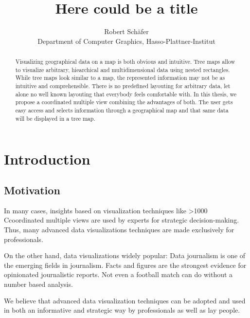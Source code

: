 \documentclass{article}
\begin{document}
\title{Here could be a title}\label{here-could-be-a-title}
\author{Robert Schäfer\\ Department of Computer Graphics, Hasso-Plattner-Institut}
\maketitle

\newcommand{\rufu}{Rundfunk \textsc{mitbestimmen}}
\newcommand\hmm[1]{\ifnum\ifhmode\spacefactor\else2000\fi>1000 \uppercase{#1}\else#1\fi}
\newcommand{\cmv}{\hmm{c}oordinated multiple view}
\newcommand{\cmvs}{\hmm{c}oordinated multiple views}

\begin{abstract}
  Visualizing geographical data on a map is both obvious and intuitive.
  Tree maps allow to visualize arbitrary, hiearchical and multidimensional data using nested rectangles.
  While tree maps look similar to a map, the represented information may not be as intuitive and comprehensible.
  There is no predefined layouting for arbitrary data, let alone no well known layouting that everybody feels comfortable with.
  In this thesis, we propose a coordinated multiple view combining the advantages of both.
  The user gets easy access and selects information through a geographical map and that same data will be displayed in a tree map.
\end{abstract}

\section{Introduction}

\subsection{Motivation}

In many cases, insights based on visualization techniques like \cmvs{} are used by experts for strategic decision-making.
Thus, many advanced data visualizations techniques are made exclusively for professionals.

On the other hand, data visualizations widely popular:
Data journalism is one of the emerging fields in journalism.
Facts and figures are the strongest evidence for opinionated journalistic reports.
Not even a football match can do without a number based analysis.

We believe that advanced data visualization techniques can be adopted and used in both an informative and strategic way by professionals as well as lay people.
\end{document}
